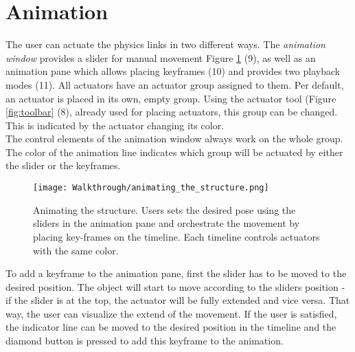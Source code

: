 \section{Animation}\label{sec:animation}
The user can actuate the physics links in two different ways. The \textit{animation window} provides a slider for manual movement Figure \ref{fig:animation} (9), as well as an animation pane which allows placing keyframes (10) and provides two playback modes (11). All actuators have an actuator group assigned to them. Per default, an actuator is placed in its own, empty group. Using the actuator tool (Figure \ref{fig:toolbar} (8), already used for placing actuators, this group can be changed. This is indicated by the actuator changing its color.\\
The control elements of the animation window always work on the whole group. The color of the animation line indicates which group will be actuated by either the slider or the keyframes.
\begin{figure}[ht!]
    \texttt{[image: Walkthrough/animating\_the\_structure.png]}
    \centering
    \caption{Animating the structure. Users sets the desired pose using the sliders in the animation pane and orchestrate the movement by placing key-frames on the timeline. Each timeline controls actuators with the same color.}
    \label{fig:animation}
\end{figure}
To add a keyframe to the animation pane, first the slider has to be moved to the desired position. The object will start to move according to the sliders position - if the slider is at the top, the actuator will be fully extended and vice versa. That way, the user can visualize the extend of the movement. If the user is satisfied, the indicator line can be moved to the desired position in the timeline and the diamond button is pressed to add this keyframe to the animation.

